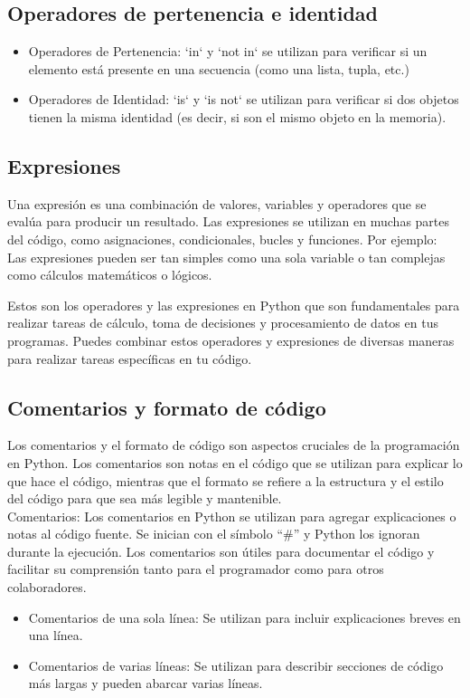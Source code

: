 \subsection{Operadores de pertenencia e identidad}
\begin{itemize}
    \item Operadores de Pertenencia: `in` y `not in` se utilizan para verificar si un elemento está presente en una secuencia (como una lista, tupla, etc.)
    \item Operadores de Identidad: `is` y `is not` se utilizan para verificar si dos objetos tienen la misma identidad (es decir, si son el mismo objeto en la memoria).
\end{itemize}

\subsection{Expresiones}
Una expresión es una combinación de valores, variables y operadores que se evalúa para producir un resultado. Las expresiones se utilizan en muchas partes del código, como asignaciones, condicionales, bucles y funciones. Por ejemplo:\\

Las expresiones pueden ser tan simples como una sola variable o tan complejas como cálculos matemáticos o lógicos.

Estos son los operadores y las expresiones en Python que son fundamentales para realizar tareas de cálculo, toma de decisiones y procesamiento de datos en tus programas. Puedes combinar estos operadores y expresiones de diversas maneras para realizar tareas específicas en tu código.

\subsection{Comentarios y formato de código}
Los comentarios y el formato de código son aspectos cruciales de la programación en Python. Los comentarios son notas en el código que se utilizan para explicar lo que hace el código, mientras que el formato se refiere a la estructura y el estilo del código para que sea más legible y mantenible.\\

Comentarios: Los comentarios en Python se utilizan para agregar explicaciones o notas al código fuente. Se inician con el símbolo ``\#'' y Python los ignoran durante la ejecución. Los comentarios son útiles para documentar el código y facilitar su comprensión tanto para el programador como para otros colaboradores. 
\begin{itemize}
    \item Comentarios de una sola línea: Se utilizan para incluir explicaciones breves en una línea.
    \item Comentarios de varias líneas: Se utilizan para describir secciones de código más largas y pueden abarcar varias líneas.
\end{itemize}

